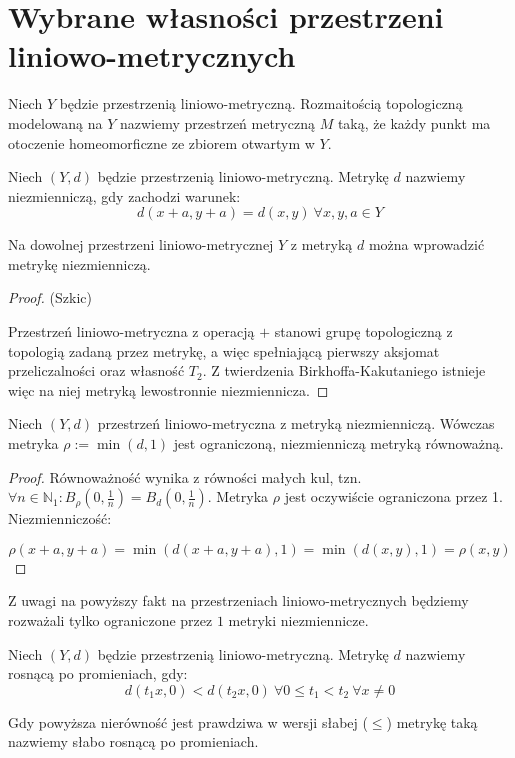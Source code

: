 \section{Wybrane własności przestrzeni liniowo-metrycznych}

\begin{df}
  Niech $Y$ będzie przestrzenią liniowo-metryczną. Rozmaitością topologiczną modelowaną na $Y$ nazwiemy przestrzeń metryczną $M$ taką, że każdy punkt ma otoczenie homeomorficzne ze zbiorem otwartym w $Y$.
\end{df}

\begin{df}
  Niech $(Y, d)$ będzie przestrzenią liniowo-metryczną. Metrykę $d$ nazwiemy niezmienniczą, gdy zachodzi warunek:
  \[d(x+a, y+a) = d(x,y)\ \forall x, y, a \in Y\] 
\end{df}


\begin{fact}
  Na dowolnej przestrzeni liniowo-metrycznej $Y$ z metryką $d$ można wprowadzić metrykę niezmienniczą.
  
  \begin{proof}(Szkic)
  
  Przestrzeń liniowo-metryczna z operacją $+$ stanowi grupę topologiczną z topologią zadaną przez metrykę, a więc spełniającą pierwszy aksjomat przeliczalności oraz własność $T_2$. Z twierdzenia Birkhoffa-Kakutaniego istnieje więc na niej metryką lewostronnie niezmiennicza.
  \end{proof}
\end{fact}

\begin{note}
  Niech $(Y, d)$ przestrzeń liniowo-metryczna z metryką niezmienniczą. Wówczas metryka $\rho := \min(d, 1)$ jest ograniczoną, niezmienniczą metryką równoważną.
  \begin{proof}
    Równoważność wynika z równości małych kul, tzn. $\forall n \in \mathbb{N}_1: B_\rho(0, \frac{1}{n}) = B_d(0, \frac{1}{n})$. Metryka $\rho$ jest oczywiście ograniczona przez 1. Niezmienniczość:
    
    \[\rho(x+a, y+a) = \min(d(x+a, y+a), 1) = \min(d(x,y), 1) = \rho(x,y)\]
  \end{proof}
\end{note}


Z uwagi na powyższy fakt na przestrzeniach liniowo-metrycznych będziemy rozważali tylko ograniczone przez $1$ metryki niezmiennicze.

\begin{df}
  Niech $(Y, d)$ będzie przestrzenią liniowo-metryczną. Metrykę $d$ nazwiemy rosnącą po promieniach, gdy:
  \[d(t_1 x, 0) < d(t_2 x, 0)\ \forall 0 \leq t_1 < t_2\ \forall x \neq 0\]
  
  Gdy powyższa nierówność jest prawdziwa w wersji słabej ($\leq$) metrykę taką nazwiemy słabo rosnącą po promieniach.
\end{df}

